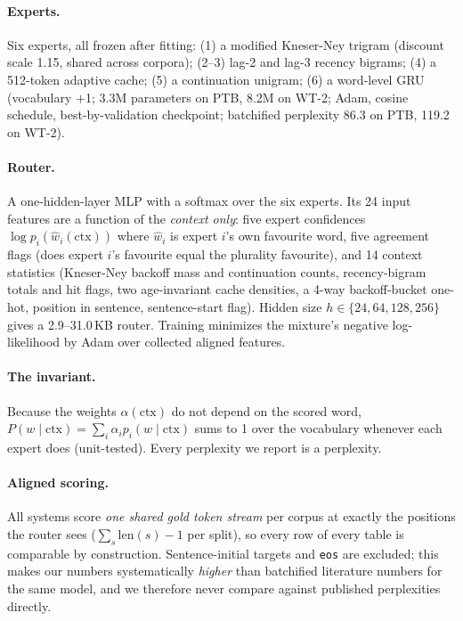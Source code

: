\documentclass[11pt]{article}
\begin{document}
\paragraph{Experts.} Six experts, all frozen after fitting: (1) a modified
Kneser-Ney trigram (discount scale 1.15, shared across corpora); (2--3) lag-2
and lag-3 recency bigrams; (4) a 512-token adaptive cache; (5) a continuation
unigram; (6) a word-level GRU (vocabulary $+$1; 3.3M parameters on PTB, 8.2M
on WT-2; Adam, cosine schedule, best-by-validation checkpoint; batchified
perplexity 86.3 on PTB, 119.2 on WT-2).

\paragraph{Router.} A one-hidden-layer MLP with a softmax over the six
experts. Its 24 input features are a function of the \emph{context only}: five
expert confidences $\log p_i(\hat w_i(\mathrm{ctx}))$ where $\hat w_i$ is
expert $i$'s own favourite word, five agreement flags (does expert $i$'s
favourite equal the plurality favourite), and 14 context statistics (Kneser-Ney
backoff mass and continuation counts, recency-bigram totals and hit flags, two
age-invariant cache densities, a 4-way backoff-bucket one-hot, position in
sentence, sentence-start flag). Hidden size $h \in \{24,64,128,256\}$ gives a
2.9--31.0\,KB router. Training minimizes the mixture's negative log-likelihood
by Adam over collected aligned features.

\paragraph{The invariant.} Because the weights $\alpha(\mathrm{ctx})$ do not
depend on the scored word, $P(w\mid\mathrm{ctx}) = \sum_i \alpha_i
p_i(w\mid\mathrm{ctx})$ sums to 1 over the vocabulary whenever each expert does
(unit-tested). Every perplexity we report is a perplexity.

\paragraph{Aligned scoring.} All systems score \emph{one shared gold token
stream} per corpus at exactly the positions the router sees
($\sum_s \mathrm{len}(s)-1$ per split), so every row of every table is
comparable by construction. Sentence-initial targets and \texttt{eos} are
excluded; this makes our numbers systematically \emph{higher} than batchified
literature numbers for the same model, and we therefore never compare against
published perplexities directly.
\end{document}
